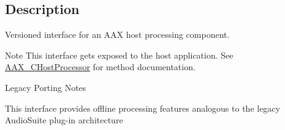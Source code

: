 \subsection{Description}
Versioned interface for an A\+A\+X host processing component. 

\begin{DoxyNote}{Note}
This interface gets exposed to the host application. See \hyperlink{a00020}{A\+A\+X\+\_\+\+C\+Host\+Processor} for method documentation.
\end{DoxyNote}
\begin{DoxyRefDesc}{Legacy Porting Notes}
\item[\hyperlink{a00384__porting_notes000036}{Legacy Porting Notes}]This interface provides offline processing features analogous to the legacy Audio\+Suite plug-\/in architecture\end{DoxyRefDesc}
